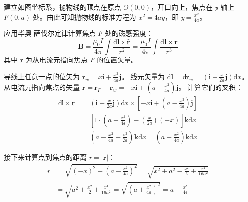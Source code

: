 \begin{solution}
建立如图坐标系，抛物线的顶点在原点 $O(0,0)$，开口向上，焦点在 $y$ 轴上 $F(0, a)$ 处。由此可知抛物线的标准方程为 $x^2 = 4ay$，即 $y = \frac{x^2}{4a}$。

应用毕奥-萨伐尔定律计算焦点 $F$ 处的磁感强度：
$$ \boldsymbol{B} = \frac{\mu_0 I}{4\pi} \int \frac{\mathrm{d}\boldsymbol{l} \times \hat{\boldsymbol{r}}}{r^2} = \frac{\mu_0 I}{4\pi} \int \frac{\mathrm{d}\boldsymbol{l} \times \boldsymbol{r}}{r^3} $$
其中 $\boldsymbol{r}$ 为从电流元指向焦点 $F$ 的位置矢量。

导线上任意一点的位矢为 $\boldsymbol{r}_w = x\mathbf{i} + \frac{x^2}{4a}\mathbf{j}$。
线元矢量为 $\mathrm{d}\boldsymbol{l} = \mathrm{d}\boldsymbol{r}_w = \left( \mathbf{i} + \frac{x}{2a}\mathbf{j} \right) \mathrm{d}x$。
从电流元指向焦点的矢量 $\boldsymbol{r} = \boldsymbol{r}_F - \boldsymbol{r}_w = -x\mathbf{i} + \left( a - \frac{x^2}{4a} \right)\mathbf{j}$。
计算它们的叉积：
\begin{align*}
    \mathrm{d}\boldsymbol{l} \times \boldsymbol{r} &= \left( \mathbf{i} + \frac{x}{2a}\mathbf{j} \right) \mathrm{d}x \times \left[ -x\mathbf{i} + \left( a - \frac{x^2}{4a} \right)\mathbf{j} \right] \\
    &= \left[ 1 \cdot \left( a - \frac{x^2}{4a} \right) - \left( \frac{x}{2a} \right) (-x) \right] \mathbf{k} \mathrm{d}x \\
    &= \left( a - \frac{x^2}{4a} + \frac{x^2}{2a} \right) \mathbf{k} \mathrm{d}x = \left( a + \frac{x^2}{4a} \right) \mathbf{k} \mathrm{d}x
\end{align*}

接下来计算点到焦点的距离 $r = |\boldsymbol{r}|$：
\begin{align*}
    r &= \sqrt{ (-x)^2 + \left( a - \frac{x^2}{4a} \right)^2 } = \sqrt{ x^2 + a^2 - \frac{x^2}{2} + \frac{x^4}{16a^2} } \\
      &= \sqrt{ a^2 + \frac{x^2}{2} + \frac{x^4}{16a^2} } = \sqrt{ \left( a + \frac{x^2}{4a} \right)^2 } = a + \frac{x^2}{4a}
\end{align*}


\end{solution}
